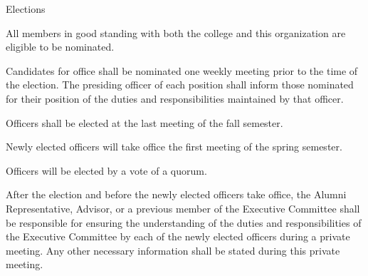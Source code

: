 {
\begin{article}{Elections}
	\item All members in good standing with both the college and this organization are eligible to be nominated.
	\item Candidates for office shall be nominated one weekly meeting prior to the time of the election. The presiding officer of each position shall inform those nominated for their position of the duties and responsibilities maintained by that officer.
	\item Officers shall be elected at the last meeting of the fall semester.
	\item Newly elected officers will take office the first meeting of the spring semester.
	\item Officers will be elected by a vote of a quorum.
	\item After the election and before the newly elected officers take office, the Alumni Representative, Advisor, or a previous member of the Executive Committee shall be responsible for ensuring the understanding of the duties and responsibilities of the Executive Committee by each of the newly elected officers during a private meeting. Any other necessary information shall be stated during this private meeting.
\end{article}
}
